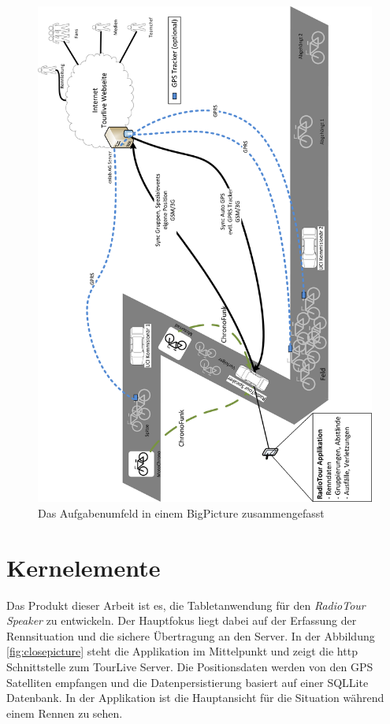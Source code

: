 \begin{figure}[h!]
\caption{Das Aufgabenumfeld in einem BigPicture zusammengefasst}
\centering
\includegraphics[scale=0.7]{05bericht/images/bigpicture.png}
\end{figure}

\newpage

\section{Kernelemente}
Das Produkt dieser Arbeit ist es, die Tabletanwendung für den \textit{RadioTour Speaker} zu entwickeln. Der Hauptfokus liegt dabei auf der Erfassung der Rennsituation und die sichere Übertragung an den Server. In der Abbildung \ref{fig:closepicture} steht die Applikation im Mittelpunkt und zeigt die \gls{http} Schnittstelle zum TourLive Server. Die Positionsdaten werden von den GPS Satelliten empfangen und die Datenpersistierung basiert auf einer SQLLite Datenbank. In der Applikation ist die Hauptansicht für die Situation während einem Rennen zu sehen.
\\

